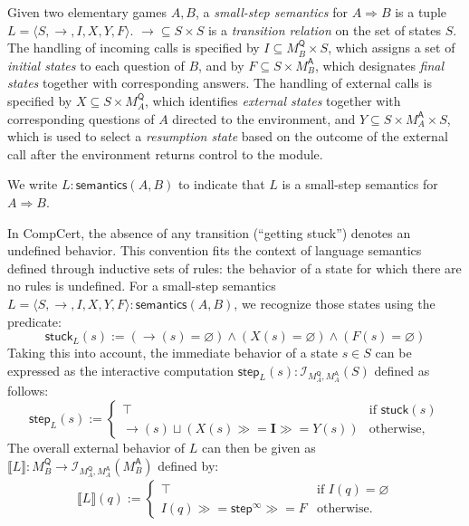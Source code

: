 \documentclass[acmsmall,timestamp,review,anonymous]{acmart}
\newcommand{\kw}[1]{\ensuremath{ \mathsf{#1} }}
\newcommand{\bind}{\gg\!\!=}
\begin{document}
\begin{definition}
Given two elementary games $A, B$,
a \emph{small-step semantics} for $A \Rightarrow B$
is a tuple $L = \langle S, \rightarrow, I, X, Y, F \rangle$.
${\rightarrow} \subseteq S \times S$ is a \emph{transition relation} on
the set of states $S$.
The handling of incoming calls is specified by
$I \subseteq M_B^\kw{Q} \times S$, which
assigns a set of \emph{initial states} to each question of $B$, and by
$F \subseteq S \times M_B^\kw{A}$,
which designates \emph{final states} together with corresponding answers.
The handling of external calls is specified by
$X \subseteq S \times M_A^\kw{Q}$,
which identifies \emph{external states} together with
corresponding questions of $A$ directed to the environment, and
$Y \subseteq S \times M_A^\kw{A} \times S$,
which is used to select a \emph{resumption state}
based on the outcome of the external call
after the environment returns control to the module.

We write $L : \kw{semantics}(A, B)$ to indicate that
$L$ is a small-step semantics for $A \Rightarrow B$.
\end{definition}

In CompCert, the absence of any transition (``getting stuck'')
denotes an undefined behavior.
This convention fits the context of
language semantics defined through inductive sets of rules:
the behavior of a state for which there are no rules is undefined.
For a small-step semantics
$L = \langle S, {\rightarrow}, I, X, Y, F \rangle : \kw{semantics}(A,B)$,
we recognize those states using the predicate:
\[
    \kw{stuck}_L(s) :=
      ({\rightarrow}(s) = \varnothing) \wedge
      (X(s) = \varnothing) \wedge
      (F(s) = \varnothing)
\]
Taking this into account,
the immediate behavior of a state $s \in S$
can be expressed as the interactive computation
$\kw{step}_L(s) : \mathcal{I}_{M_A^\kw{Q},M_A^\kw{A}}(S)$
defined as follows:
\[
  \kw{step}_L(s) :=
    \begin{cases}
      \top & \mbox{if } \kw{stuck}(s) \\
      {\rightarrow}(s) \sqcup
      (X(s) \bind \mathbf{I} \bind Y(s)) & \mbox{otherwise,}
   \end{cases}
\]
The overall external behavior of $L$
can then be given as
$
    \llbracket L \rrbracket :
      M_B^\kw{Q} \rightarrow \mathcal{I}_{M_A^\kw{Q},M_A^\kw{A}}(M_B^\kw{A})
$
defined by:
\begin{align*}
  \llbracket L \rrbracket (q) :=
    \begin{cases}
       \top & \mbox{if } I(q) = \varnothing \\
       I(q) \bind \kw{step}^\infty \bind F & \mbox{otherwise.}
     \end{cases}
\end{align*}
\end{document}
